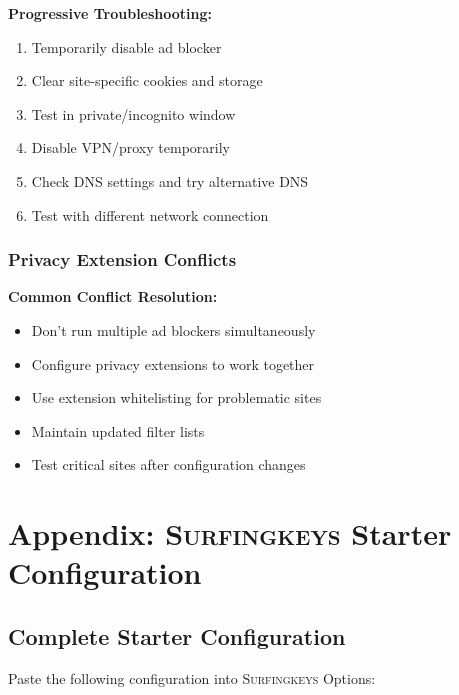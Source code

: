\documentclass[11pt,a4paper,oneside]{book}
\newcommand{\surfingkeys}{\textsc{Surfingkeys}}
\begin{document}
\textbf{Progressive Troubleshooting:}
\begin{enumerate}
    \item Temporarily disable ad blocker
    \item Clear site-specific cookies and storage
    \item Test in private/incognito window
    \item Disable VPN/proxy temporarily
    \item Check DNS settings and try alternative DNS
    \item Test with different network connection
\end{enumerate}

\subsection{Privacy Extension Conflicts}

\textbf{Common Conflict Resolution:}
\begin{itemize}
    \item Don't run multiple ad blockers simultaneously
    \item Configure privacy extensions to work together
    \item Use extension whitelisting for problematic sites
    \item Maintain updated filter lists
    \item Test critical sites after configuration changes
\end{itemize}

\chapter{Appendix: \surfingkeys{} Starter Configuration}

\section{Complete Starter Configuration}

Paste the following configuration into \surfingkeys{} Options:
\end{document}
